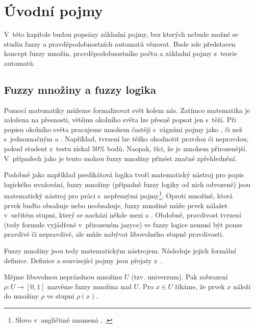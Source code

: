 \section{Úvodní pojmy}
V~této kapitole budou popsány základní pojmy, bez kterých nebude možné se studiu fuzzy a pravděpodobnostních automatů věnovat. Bude zde představen koncept fuzzy množin, pravděpodobnostního počtu a základní pojmy z~teorie automatů.

\subsection{Fuzzy množiny a fuzzy logika}
Pomocí matematiky můžeme formalizovat svět kolem nás. Zatímco matematika je založena na přesnosti, většinu okolního světa lze přesně popsat jen s~těží. Při popisu okolního světa pracujeme mnohem častěji s~vágními pojmy jako ,  či  než s~jednoznačným  a . Například, tvrzení  lze těžko ohodnotit pravdou či nepravdou, pokud student z~testu získal $50\%$ bodů. Naopak, říci, že  je mnohem přirozenější. V~případech jako je tento mohou fuzzy množiny přinést značné zpřehlednění.

Podobně jako například predikátová logika tvoří matematický nástroj pro popis logického uvažování, fuzzy množiny (případně fuzzy logiky od nich odvozené) jsou matematický nástroj pro práci s~nepřesnými pojmy\footnote{Slovo  v~angličtině znamená , , }. Oproti  množině, která prvek buďto obsahuje nebo neobsahuje, fuzzy množině může prvek nálažet v~určitém stupni, který se nachází někde mezi  a . Obdobně, pravdivost tvrzení (tedy formule vyjádřené v~přirozeném jazyce) ve fuzzy logice nemusí být pouze pravdivé či nepravdivé, ale může nabývat libovolného stupně pravdivosti.

Fuzzy množiny jsou tedy matematickým nástrojem. Následuje jejich formální definice. Definice a související pojmy jsou přejaty z~\cite{Bel-FuzRelSys}.

\begin{definition}
 Mějme libovolnou neprázdnou množinu $U$ (tzv. univerzum). Pak zobrazení $\rho: U \rightarrow [0, 1]$ nazvěme fuzzy množina nad $U$. Pro $x \in U$ říkáme, že prvek $x$ náleží do množiny $\rho$ ve stupni $\rho(x)$.
\end{definition}

